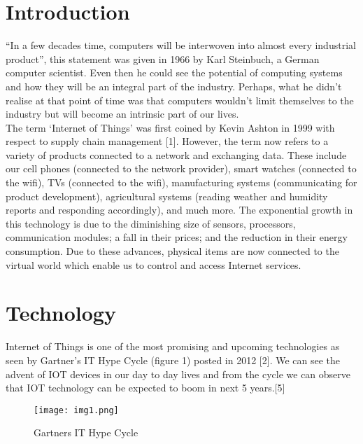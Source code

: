 \documentclass[conference]{IEEEtran}
\begin{document}
\section{Introduction}
\blindtext
“In a few decades time, computers will be interwoven into almost every industrial product”, this statement was given in 1966 by Karl Steinbuch, a German computer scientist. Even then he could see the potential of computing systems and how they will be an integral part of the industry. Perhaps, what he didn't realise at that point of time was that computers wouldn’t limit themselves to the industry but will become an intrinsic part of our lives. \\
The term ‘Internet of Things’ was first coined by Kevin Ashton in 1999 with respect to supply chain management [1]. However, the term now refers to a variety of products connected to a network and exchanging data. These include our cell phones (connected to the network provider), smart watches (connected to the wifi), TVs (connected to the wifi), manufacturing systems (communicating for product development), agricultural systems (reading weather and humidity reports and responding accordingly), and much more. The exponential growth in this technology is due to the diminishing size of sensors, processors, communication modules; a fall in their prices; and the reduction in their energy consumption. Due to these advances, physical items are now connected to the virtual world which enable us to control and access Internet services. 


\section{Technology}
Internet of Things is one of the most promising and upcoming technologies as seen by Gartner’s IT Hype Cycle (figure 1) posted in 2012 [2]. We can see the advent of IOT devices in our day to day lives and from the cycle we can observe that IOT technology can be expected to boom in next 5 years.[5]




\begin{figure}[H]
\centering
\texttt{[image: img1.png]}
\caption{Gartners  IT  Hype  Cycle}
\label{fig_sim}
\end{figure}
\end{document}
